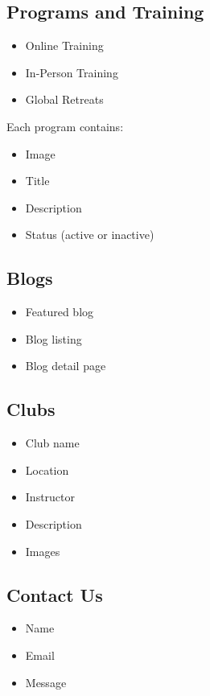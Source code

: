 \documentclass[12pt,a4paper]{article}
\begin{document}
\subsection{Programs and Training}
\begin{itemize}
    \item Online Training
    \item In-Person Training
    \item Global Retreats
\end{itemize}

Each program contains:
\begin{itemize}
    \item Image
    \item Title
    \item Description
    \item Status (active or inactive)
\end{itemize}

\subsection{Blogs}
\begin{itemize}
    \item Featured blog
    \item Blog listing
    \item Blog detail page
\end{itemize}

\subsection{Clubs}
\begin{itemize}
    \item Club name
    \item Location
    \item Instructor
    \item Description
    \item Images
\end{itemize}

\subsection{Contact Us}
\begin{itemize}
    \item Name
    \item Email
    \item Message
\end{itemize}
\end{document}
